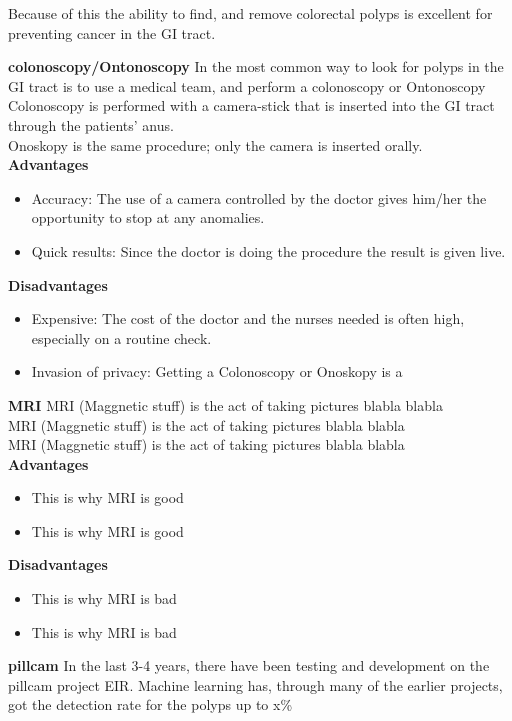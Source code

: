         
    Because of this the ability to find, and remove colorectal polyps is excellent for preventing cancer in the GI tract. 
    
    
    \vspace{10px}
    \textbf{colonoscopy/Ontonoscopy}
    In the most common way to look for polyps in the GI tract is to use a medical team, and perform a colonoscopy or Ontonoscopy
Colonoscopy is performed with a camera-stick that is inserted into the GI tract through the patients' anus.\\
    Onoskopy is the same procedure; only the camera is inserted orally. \\
    
    \textbf{Advantages}
      \begin{itemize}
        \item Accuracy: The use of a camera controlled by the doctor gives him/her the opportunity to stop at any anomalies.
        \item Quick results: Since the doctor is doing the procedure the result is given live.
      \end{itemize}

    \vspace{5px}
    \textbf{Disadvantages}
      \begin{itemize}
        \item Expensive: The cost of the doctor and the nurses needed is often high, especially on a routine check.
        \item Invasion of privacy: Getting a Colonoscopy or Onoskopy is a %
      \end{itemize}
    
    \vspace{10px}
    \textbf{MRI}
    MRI (Maggnetic stuff) is the act of taking pictures blabla blabla\\
    MRI (Maggnetic stuff) is the act of taking pictures blabla blabla\\
    MRI (Maggnetic stuff) is the act of taking pictures blabla blabla\\
    \textbf{Advantages}
      \begin{itemize}
        \item This is why MRI is good %
        \item This is why MRI is good %
      \end{itemize}

    \vspace{5px}
    \textbf{Disadvantages}
      \begin{itemize}
        \item This is why MRI is bad %
        \item This is why MRI is bad %
      \end{itemize}
    \vspace{10px}
    \textbf{pillcam}
    In the last 3-4 years, there have been testing and development on the pillcam project EIR. Machine learning has, through many of the earlier projects, got the detection rate for the polyps up to x\% %
    
